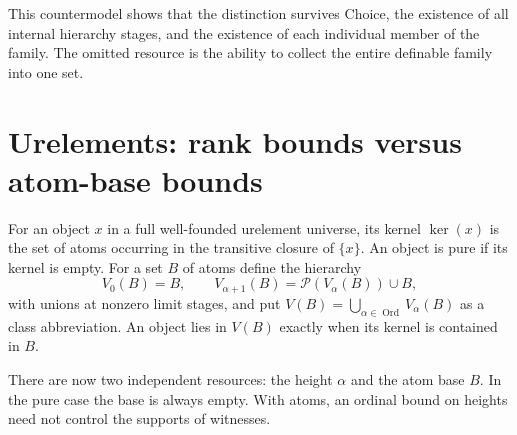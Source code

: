 \documentclass[11pt,letterpaper]{article}
\theoremstyle{definition}
\theoremstyle{remark}
\newcommand{\Ord}{\operatorname{Ord}}
\newcommand{\Pow}{\mathcal P}
\newcommand{\card}[1]{\lvert#1\rvert}
\newcommand{\cf}{\operatorname{cf}}
\newcommand{\lbl}[1]{\nolinkurl{#1}}
\newcommand{\repo}[1]{\nolinkurl{#1}}
\newcommand{\NIB}{\mathsf{NIB}}
\newcommand{\kerat}{\operatorname{ker}}
\begin{document}
This countermodel shows that the distinction survives Choice, the existence of all internal hierarchy stages, and the existence of each individual member of the family. The omitted resource is the ability to collect the entire definable family into one set.

\noindent[Added 4 October 2026, batch~89: the class form of this failure at
every limit height, recorded in \cref{hset:zr:rem:swo}. Part~XV of
\repo{foundations-and-computation/surreal-well-orders} (its source~31, batch-89
manuscript~01) uses the same witness $n\mapsto\omega+n$ at
$\lambda=\omega+\omega$ (its Section~XV.11, \lbl{swo:gcz:sec:examples}). In the
two-sorted full-class rank model $(V_\lambda,\Pow(V_\lambda))$, for every limit
$\lambda>\omega$, class Replacement and class Collection on an internal set $a$
hold exactly when $\card{a}<\cf\lambda$ (its Lemma~XV.9.2,
\lbl{swo:gcz:lem:domain}), and full class Replacement holds exactly when
$\lambda$ is strongly inaccessible (its Theorem~XV.9.3,
\lbl{swo:gcz:thm:replacement}). The failure of Replacement above is the
definable case at a height of cofinality $\omega$; the failure of $\NIB$ is
source~10's own. Neither manuscript cites the other.]

\section{Urelements: rank bounds versus atom-base bounds}
\label{hset:zr:sec:tworesources}

For an object $x$ in a full well-founded urelement universe, its kernel $\kerat(x)$ is the set of atoms occurring in the transitive closure of $\{x\}$. An object is pure if its kernel is empty. For a set $B$ of atoms define the hierarchy
\[
V_0(B)=B,\qquad V_{\alpha+1}(B)=\Pow(V_\alpha(B))\cup B,
\]
with unions at nonzero limit stages, and put $V(B)=\bigcup_{\alpha\in\Ord}V_\alpha(B)$ as a class abbreviation. An object lies in $V(B)$ exactly when its kernel is contained in $B$.

There are now two independent resources: the height $\alpha$ and the atom base $B$. In the pure case the base is always empty. With atoms, an ordinal bound on heights need not control the supports of witnesses.
\end{document}
